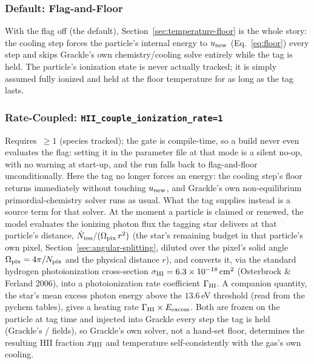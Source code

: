 \subsubsection{Default: Flag-and-Floor}

With the flag off (the default),
Section~\ref{sec:temperature-floor} is the whole story:
the cooling step forces the particle's internal
energy to $u_{\rm new}$ (Eq.~\ref{eq:floor}) every step and skips
Grackle's own chemistry/cooling solve entirely while the tag is held.
The particle's ionization state is never actually tracked; it is
simply assumed fully ionized and held at the floor temperature for as
long as the tag lasts.

\subsubsection{Rate-Coupled: \texttt{HII\_couple\_ionization\_rate=1}}

Requires $\,\ge 1$ (species tracked); the
gate is compile-time, so a 
build never even evaluates the flag: setting it in the parameter file
at that mode is a silent no-op, with no warning at start-up, and the
run falls back to flag-and-floor unconditionally. Here the tag no
longer forces an energy: the cooling step's floor
returns immediately without touching $u_{\rm new}$, and
Grackle's own non-equilibrium primordial-chemistry solver runs as
usual. What the tag supplies instead is a source term for that solver.
At the moment a particle is claimed or renewed, the model evaluates
the ionizing photon flux the tagging star delivers at that particle's
distance, $\dot N_{\rm ion}/(\Omega_{\rm pix}\, r^2)$ (the star's
remaining budget in that particle's own pixel,
Section~\ref{sec:angular-splitting}, diluted over the pixel's solid
angle $\Omega_{\rm pix}=4\pi/N_{\rm pix}$ and the physical distance
$r$), and converts it, via the standard hydrogen photoionization
cross-section $\sigma_{\rm HI}=6.3\times10^{-18}\,{\rm cm^2}$ (Osterbrock
\& Ferland 2006), into a photoionization rate coefficient
$\Gamma_{\rm HI}$.
A companion quantity, the star's mean excess photon energy above the
$13.6\,$eV threshold (read from the pychem tables),
gives a heating rate $\Gamma_{\rm HI}\times E_{\rm excess}$. Both are
frozen on the particle at tag time and injected into Grackle every
step the tag is held (Grackle's
/
fields), so Grackle's own solver, not a hand-set floor, determines the
resulting HII fraction $x_{\rm HII}$ and temperature self-consistently
with the gas's own cooling.

